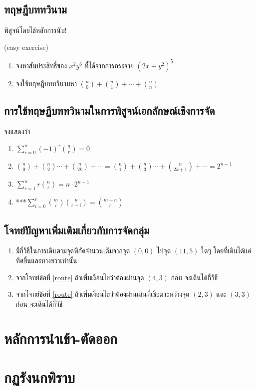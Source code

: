 \subsection{ทฤษฎีบททวินาม}
พิสูจน์โดยใช้หลักการนับ!

\begin{exam}(easy exercise)
	\begin{enumerate}
		\item จงหาสัมประสิทธิ์ของ $ x^2y^6 $ ที่ได้จากการกระจาย $ (2x+y^2)^5 $
		\item จงใช้ทฤษฎีบททวินามหา $ \binom{n}{0}+\binom{n}{1}+\cdots+\binom{n}{n} $
	\end{enumerate}
\end{exam}
\subsection{การใช้ทฤษฎีบททวินามในการพิสูจน์เอกลักษณ์เชิงการจัด}
\begin{exam}
	จงแสดงว่า\begin{enumerate}
		\item $ \sum_{r=0}^n (-1)^r\binom{n}{r}=0 $
		\item $ \binom{n}{0}+\binom{n}{2}\cdots+\binom{n}{2k}+\cdots = \binom{n}{1}+\binom{n}{3}\cdots+\binom{n}{2k+1}+\cdots = 2^{n-1} $
		\item $ \sum_{r=1}^n r\binom{n}{r}=n\cdot2^{n-1} $
		\item ***$ \sum_{i=0}^r\binom{m}{i}\binom{n}{r-i}=\binom{m+n}{r} $
	\end{enumerate}
\end{exam}

\subsection{โจทย์ปัญหาเพิ่มเติมเกี่ยวกับการจัดกลุ่ม}
\begin{exam}
	\begin{enumerate}
		\item \label{route} มีกี่วิธีในการเดินตามจุดพิกัดจำนวนเต็มจากจุด $ (0,0) $ ไปจุด $ (11,5) $ ใดๆ โดยที่เดินได้แค่ทิศขึ้นและทางขวาเท่านั้น
		\item จากโจทย์ข้อที่ \ref{route} ถ้าเพิ่มเงื่อนไขว่าต้องผ่านจุด $ (4,3) $ ก่อน จะเดินได้กี่วิธี
		\item จากโจทย์ข้อที่ \ref{route} ถ้าเพิ่มเงื่อนไขว่าต้องผ่านเส้นที่เชื่อมระหว่างจุด $ (2,3) $ และ $ (3,3) $ ก่อน จะเดินได้กี่วิธี
	\end{enumerate}
\end{exam}

\section{หลักการนำเข้า-ตัดออก}

\section{กฏรังนกพิราบ}